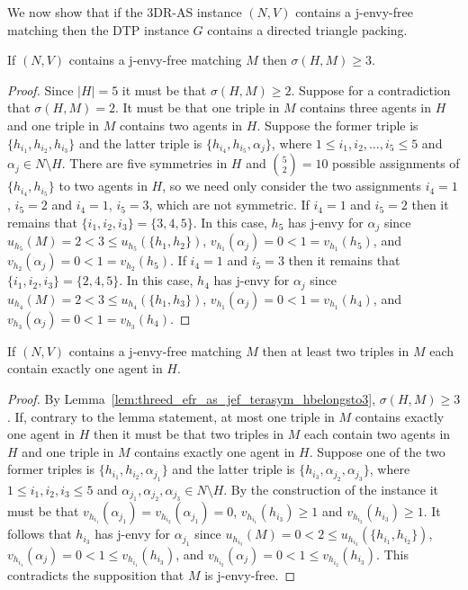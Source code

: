 We now show that if the 3DR-AS instance $(N, V)$ contains a j-envy-free matching then the DTP instance $G$ contains a directed triangle packing.

\begin{lem}
\label{lem:threed_efr_as_jef_terasym_hbelongsto3}
If $(N, V)$ contains a j-envy-free matching $M$ then $\sigma(H, M) \geq 3$.
\end{lem}
\begin{proof}
Since $|H|=5$ it must be that $\sigma(H, M) \geq 2$. Suppose for a contradiction that $\sigma(H, M) = 2$. It must be that one triple in $M$ contains three agents in $H$ and one triple in $M$ contains two agents in $H$. Suppose the former triple is $\{ h_{i_1}, h_{i_2}, h_{i_3} \}$ and the latter triple is $\{ h_{i_4}, h_{i_5}, \alpha_j \}$, where $1\leq i_1, i_2, \dots, i_5 \leq 5$ and $\alpha_j \in N \setminus H$. There are five symmetries in $H$ and $\binom{5}{2}=10$ possible assignments of $\{ h_{i_4}, h_{i_5} \}$ to two agents in $H$, so we need only consider the two assignments $i_4 = 1$, $i_5 = 2$ and $i_4 = 1$, $i_5 = 3$, which are not symmetric. If $i_4 = 1$ and $i_5 = 2$ then it remains that $\{ i_1, i_2, i_3 \} = \{ 3, 4, 5 \}$. In this case, $h_5$ has j-envy for $\alpha_j$ since $u_{h_5}(M) = 2 < 3 \leq u_{h_5}(\{ h_1, h_2 \})$, $v_{h_1}(\alpha_j) = 0 < 1 = v_{h_1}(h_5)$, and $v_{h_2}(\alpha_j) = 0 < 1 = v_{h_2}(h_5)$. If $i_4 = 1$ and $i_5 = 3$ then it remains that $\{ i_1, i_2, i_3 \} = \{ 2, 4, 5 \}$. In this case, $h_4$ has j-envy for $\alpha_j$ since $u_{h_4}(M) = 2 < 3 \leq u_{h_4}(\{ h_1, h_3 \})$, $v_{h_1}(\alpha_j) = 0 < 1 = v_{h_1}(h_4)$, and $v_{h_3}(\alpha_j) = 0 < 1 = v_{h_3}(h_4)$. 
\end{proof}

\begin{lem}
\label{lem:threed_efr_as_jef_terasym_atleasttwotriplescontainoneagentinH}
If $(N, V)$ contains a j-envy-free matching $M$  then at least two triples in $M$ each contain exactly one agent in $H$.
\end{lem}
\begin{proof}
By Lemma~\ref{lem:threed_efr_as_jef_terasym_hbelongsto3}, $\sigma(H, M) \geq 3$. If, contrary to the lemma statement, at most one triple in $M$ contains exactly one agent in $H$ then it must be that two triples in $M$ each contain two agents in $H$ and one triple in $M$ contains exactly one agent in $H$. Suppose one of the two former triples is $\{ h_{i_1}, h_{i_2}, \alpha_{j_1} \}$ and the latter triple is $\{ h_{i_3}, \alpha_{j_2}, \alpha_{j_3} \}$, where $1\leq i_1, i_2, i_3 \leq 5$ and $\alpha_{j_1}, \alpha_{j_2}, \alpha_{j_3} \in N \setminus H$. By the construction of the instance it must be that $v_{h_{i_1}}(\alpha_{j_1}) = v_{h_{i_2}}(\alpha_{j_1}) = 0$,  $v_{h_{i_1}}(h_{i_3}) \geq 1$ and $v_{h_{i_2}}(h_{i_3}) \geq 1$. It follows that $h_{i_3}$ has j-envy for $\alpha_{j_1}$ since $u_{h_{i_3}}(M) = 0 < 2 \leq u_{h_{i_3}}(\{ h_{i_1}, h_{i_2} \})$, $v_{h_{i_1}}(\alpha_j) = 0 < 1 \leq v_{h_{i_1}}(h_{i_3})$, and $v_{h_{i_2}}(\alpha_j) = 0 < 1 \leq v_{h_{i_2}}(h_{i_3})$. This contradicts the supposition that $M$ is j-envy-free.
\end{proof}

